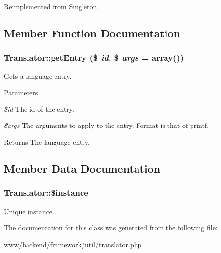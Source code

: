 Reimplemented from \hyperlink{classSingleton}{Singleton}.



\subsection{Member Function Documentation}
\hypertarget{classTranslator_a889df34e7a06e9126b202cab6241dc10}{
\subsubsection[{getEntry}]{\setlength{\rightskip}{0pt plus 5cm}Translator::getEntry (\$ {\em id}, \/  \$ {\em args} = {\ttfamily array()})}}
\label{classTranslator_a889df34e7a06e9126b202cab6241dc10}
Gets a language entry.


\begin{DoxyParams}{Parameters}
\item[{\em \$id}]The id of the entry. \item[{\em \$args}]The arguments to apply to the entry. Format is that of printf.\end{DoxyParams}
\begin{DoxyReturn}{Returns}
The language entry. 
\end{DoxyReturn}


\subsection{Member Data Documentation}
\hypertarget{classTranslator_a5003e4312c37dc1c83fde700e5ee1e9f}{
\subsubsection[{\$instance}]{\setlength{\rightskip}{0pt plus 5cm}Translator::\$instance}}
\label{classTranslator_a5003e4312c37dc1c83fde700e5ee1e9f}
Unique instance. 

The documentation for this class was generated from the following file:\begin{DoxyCompactItemize}
\item 
www/backend/framework/util/translator.php\end{DoxyCompactItemize}

